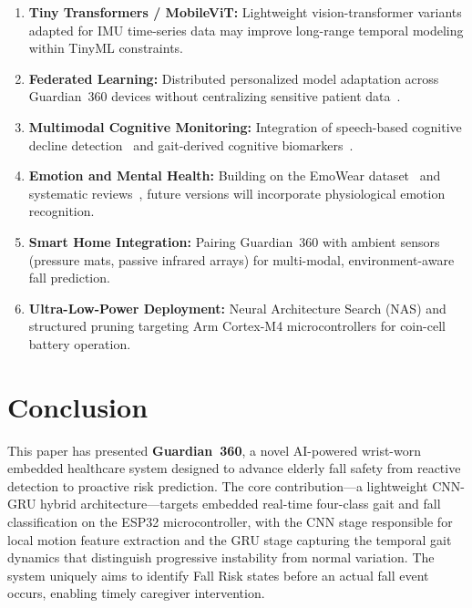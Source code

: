 \documentclass[conference]{IEEEtran}
\begin{document}
\begin{enumerate}
  \item \textbf{Tiny Transformers / MobileViT:} Lightweight
        vision-transformer variants adapted for IMU time-series data may
        improve long-range temporal modeling within TinyML constraints.
  \item \textbf{Federated Learning:} Distributed personalized model
        adaptation across Guardian~360 devices without centralizing
        sensitive patient data~\cite{khalil2026}.
  \item \textbf{Multimodal Cognitive Monitoring:} Integration of
        speech-based cognitive decline detection~\cite{huang2024,ambrosini2019}
        and gait-derived cognitive biomarkers~\cite{tsiakiri2025}.
  \item \textbf{Emotion and Mental Health:} Building on the EmoWear
        dataset~\cite{rahmani2024} and systematic reviews~\cite{vogka2025},
        future versions will incorporate physiological emotion recognition.
  \item \textbf{Smart Home Integration:} Pairing Guardian~360 with ambient
        sensors (pressure mats, passive infrared arrays) for multi-modal,
        environment-aware fall prediction.
  \item \textbf{Ultra-Low-Power Deployment:} Neural Architecture Search
        (NAS) and structured pruning targeting Arm Cortex-M4
        microcontrollers for coin-cell battery operation.
\end{enumerate}

\section{Conclusion}
\label{sec:conclusion}

This paper has presented \textbf{Guardian~360}, a novel AI-powered wrist-worn
embedded healthcare system designed to advance elderly fall safety from
reactive detection to proactive risk prediction. The core contribution---a
lightweight CNN-GRU hybrid architecture---targets embedded real-time
four-class gait and fall classification on the ESP32 microcontroller, with
the CNN stage responsible for local motion feature extraction and the GRU
stage capturing the temporal gait dynamics that distinguish progressive
instability from normal variation. The system uniquely aims to identify Fall
Risk states before an actual fall event occurs, enabling timely caregiver
intervention.
\end{document}
